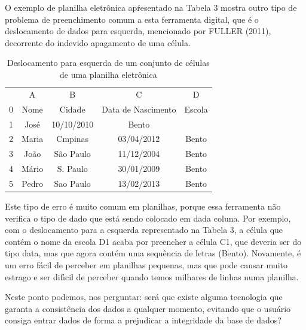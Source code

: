 \documentclass[
12pt,		%
openright,	%
twoside,  %
a4paper,			%
chapter=TITLE,		%
english,			%
french,				%
spanish,			%
brazil				%
]{USPSC-classe/USPSC}
\begin{document}
O exemplo de planilha eletr\^onica apŕesentado na Tabela 3 mostra outro tipo de problema de preenchimento comum a esta ferramenta digital, que \'e o deslocamento de dados para esquerda,  mencionado por  FULLER (2011), decorrente do indevido apagamento de uma c\'elula.












\begin{table}[htb]
\tiny
\caption{\label{f6feaa39313aa0691b7fdadc84175a203e68bf77}Deslocamento para esquerda de um conjunto de c\'elulas de uma planilha eletr\^onica}

\centering
\begin{tabular}{|c|c|c|c|c|}
\hline
  &  A  &  B  &  C  &  D  \\
0 & Nome  &  Cidade  &  Data de Nascimento  &  Escola \\
1 & Jos\'e  &  10/10/2010  &  Bento  &   \\
2 & Maria  &  Cmpinas  &  03/04/2012  &  Bento \\
3 & Jo\~ao  &  S\~ao Paulo  &  11/12/2004  &  Bento \\
4 & M\'ario  &  S. Paulo  &  30/01/2009  &  Bento \\
5 & Pedro  &  Sao Paulo  &  13/02/2013  &  Bento \\
\hline
\end{tabular}
\end{table}


Este tipo de erro \'e muito comum em  planilhas, porque essa ferramenta n\~ao verifica o tipo de dado que est\'a sendo colocado em dada coluna. Por exemplo, com o deslocamento para a esquerda representado na Tabela 3, a c\'elula que cont\'em o nome da escola D1 acaba por preencher a c\'elula C1, que deveria ser do tipo data, mas que agora cont\'em uma sequ\^encia de letras (\textquotedbl Bento\textquotedbl ). Novamente, \'e um erro f\'acil de perceber em planilhas pequenas, mas que pode causar muito estrago e ser dif\'{\i}cil de perceber quando temos milhares de linhas numa planilha.








Neste ponto podemos, nos perguntar: ser\'a que existe alguma tecnologia que garanta a consist\^encia dos dados a qualquer momento, evitando que o usu\'ario consiga entrar dados de forma a prejudicar a integridade da base de dados?
\end{document}
